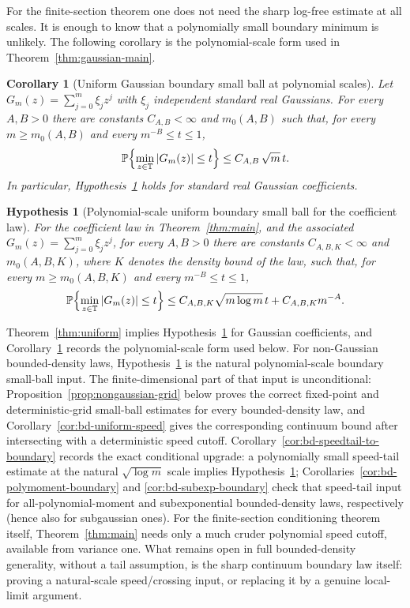 \documentclass[11pt]{amsart}
\numberwithin{equation}{section}
\newtheorem{corollary}[theorem]{Corollary}
\newtheorem{hypothesis}[theorem]{Hypothesis}
\theoremstyle{definition}
\theoremstyle{remark}
\newcommand{\T}{\mathbb T}
\newcommand{\Prob}{\mathbb P}
\newcommand{\abs}[1]{\left\lvert #1\right\rvert}
\begin{document}
For the finite-section theorem one does not need the sharp log-free estimate at
all scales.  It is enough to know that a polynomially small boundary minimum is
unlikely.  The following corollary is the polynomial-scale form used in
Theorem~\ref{thm:gaussian-main}.

\begin{corollary}[Uniform Gaussian boundary small ball at polynomial scales]\label{prop:uniform-polylog}
Let \(G_m(z)=\sum_{j=0}^m\xi_jz^j\) with \(\xi_j\) independent standard real Gaussians. For every \(A,B>0\) there are constants \(C_{A,B}<\infty\) and \(m_0(A,B)\) such that, for every \(m\ge m_0(A,B)\) and every \(m^{-B}\le t\le1\),
\begin{equation}\label{eq:uniform-polylog}
  \Prob\Bigl\{\min_{z\in\T}\abs{G_m(z)}\le t\Bigr\}
  \le C_{A,B}\,\sqrt m\,t.
\end{equation}
In particular, Hypothesis~\ref{hyp:boundary-law} holds for standard real Gaussian coefficients.
\end{corollary}

\begin{hypothesis}[Polynomial-scale uniform boundary small ball for the coefficient law]\label{hyp:boundary-law}
For the coefficient law in Theorem~\ref{thm:main}, and the associated
\(G_m(z)=\sum_{j=0}^m\xi_jz^j\), for every \(A,B>0\) there are constants
\(C_{A,B,K}<\infty\) and \(m_0(A,B,K)\), where \(K\) denotes the density bound
of the law, such that, for every
\(m\ge m_0(A,B,K)\) and every \(m^{-B}\le t\le1\),
\[
  \Prob\Bigl\{\min_{z\in\T}\abs{G_m(z)}\le t\Bigr\}
  \le C_{A,B,K}\sqrt{m\log m}\,t+C_{A,B,K}m^{-A}.
\]
\end{hypothesis}

Theorem~\ref{thm:uniform} implies Hypothesis~\ref{hyp:boundary-law} for
Gaussian coefficients, and Corollary~\ref{prop:uniform-polylog} records the
polynomial-scale form used below.  For non-Gaussian
bounded-density laws, Hypothesis~\ref{hyp:boundary-law} is the natural
polynomial-scale boundary small-ball input.  The finite-dimensional
part of that input is unconditional: Proposition~\ref{prop:nongaussian-grid}
below proves the correct fixed-point and deterministic-grid small-ball estimates
for every bounded-density law, and Corollary~\ref{cor:bd-uniform-speed} gives the
corresponding continuum bound after intersecting with a deterministic speed
cutoff.  Corollary~\ref{cor:bd-speedtail-to-boundary} records the exact
conditional upgrade: a polynomially small speed-tail estimate at the natural
\(\sqrt{\log m}\) scale implies Hypothesis~\ref{hyp:boundary-law};
Corollaries~\ref{cor:bd-polymoment-boundary} and
\ref{cor:bd-subexp-boundary} check that speed-tail input for
all-polynomial-moment and subexponential bounded-density laws, respectively
(hence also for subgaussian ones). For the finite-section conditioning theorem
itself, Theorem~\ref{thm:main} needs only a much cruder
polynomial speed cutoff, available from variance one. What remains open in full
bounded-density generality, without a tail assumption, is the sharp continuum
boundary law itself: proving a natural-scale speed/crossing input, or replacing
it by a genuine local-limit argument.
\end{document}
